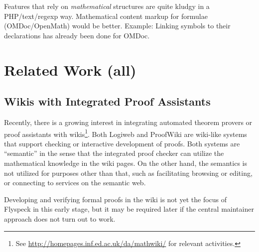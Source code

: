 \documentclass{llncs}
\begin{document}
Features that rely on \emph{mathematical} structures are quite kludgy in a PHP/text/regexp
way.  Mathematical content markup for formulae (OMDoc/OpenMath) would be better.  Example:
Linking symbols to their declarations has already been done for OMDoc.




\section{Related Work (all)}
\label{sec:related}


\subsection{Wikis with Integrated Proof Assistants}
\label{sec:wiki-pa}

Recently, there is a growing interest in integrating automated theorem provers or proof
assistants with wikis\footnote{See \url{http://homepages.inf.ed.ac.uk/da/mathwiki/} for
  relevant activities.}.  Both Logiweb and ProofWiki are wiki-like systems that support
checking or interactive development of proofs.  Both systems are ``semantic'' in the sense
that the integrated proof checker can utilize the mathematical knowledge in the wiki
pages.  On the other hand, the semantics is not utilized for purposes other than that,
such as facilitating browsing or editing, or connecting to services on the semantic
web.  

Developing and verifying formal proofs in the wiki is not yet the focus of Flyspeck in
this early stage, but it may be required later if the central maintainer approach does not
turn out to work.
\end{document}
